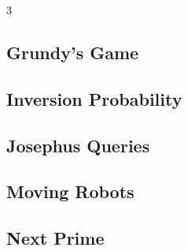 \documentclass[8pt]{extarticle}
\begin{document}
\begin{multicols*}{3}
\subsection{Grundy's Game}
\begin{caixaenunciado}

\end{caixaenunciado}
\vspace{0.3cm}


\subsection{Inversion Probability}
\begin{caixaenunciado}

\end{caixaenunciado}
\vspace{0.3cm}


\subsection{Josephus Queries}
\begin{caixaenunciado}

\end{caixaenunciado}
\vspace{0.3cm}


\subsection{Moving Robots}
\begin{caixaenunciado}

\end{caixaenunciado}
\vspace{0.3cm}


\subsection{Next Prime}
\begin{caixaenunciado}

\end{caixaenunciado}
\vspace{0.3cm}



\end{multicols*}
\end{document}
